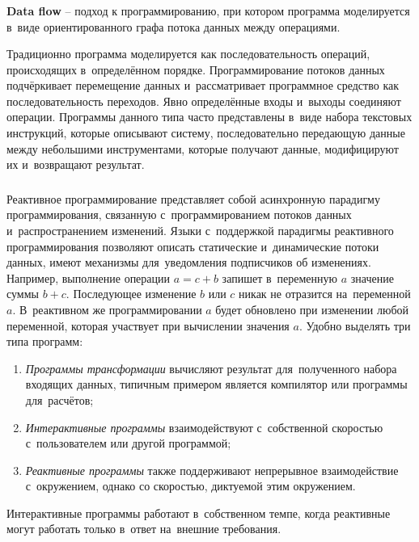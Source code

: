 \subsubsection{}
\label{sec:analysis:research:mobArch:dataflow}

\textbf{Data flow} -- подход к программированию, при котором программа моделируется в~виде ориентированного графа потока данных между операциями\cite{wiki:data-flow}.

Традиционно программа моделируется как последовательность операций, происходящих в~определённом порядке. Программирование потоков данных подчёркивает перемещение данных и~рассматривает программное средство как последовательность переходов. Явно определённые входы и~выходы соединяют операции. Программы данного типа часто представлены в~виде набора текстовых инструкций, которые описывают систему, последовательно передающую данные между небольшими инструментами, которые получают данные, модифицируют их и~возвращают результат. 

\subsubsection{}
\label{sec:analysis:research:mobArch:reactive}

Реактивное программирование представляет собой асинхронную парадигму программирования, связанную с~программированием потоков данных и~распространением изменений. Языки с~поддержкой парадигмы реактивного программирования позволяют описать статические и~динамические потоки данных, имеют механизмы для~уведомления подписчиков об изменениях. Например, выполнение операции \(a = c + b\) запишет в~переменную \(a\) значение суммы \(b + c\). Последующее изменение \(b\) или \(c\) никак не отразится на~переменной \(a\). В~реактивном же программировании \(a\) будет обновлено при изменении любой переменной, которая участвует при вычислении значения \(a\).
Удобно выделять три типа программ:
\begin{enumerate}
	\item \emph{Программы трансформации} вычисляют результат для~полученного набора входящих данных, типичным примером является компилятор или программы для~расчётов;
	\item \emph{Интерактивные программы} взаимодействуют с~собственной скоростью с~пользователем или другой программой;
	\item \emph{Реактивные программы} также поддерживают непрерывное взаимодействие с~окружением, однако со скоростью, диктуемой этим окружением.
\end{enumerate}
Интерактивные программы работают в~собственном темпе, когда реактивные могут работать только в~ответ на~внешние требования.